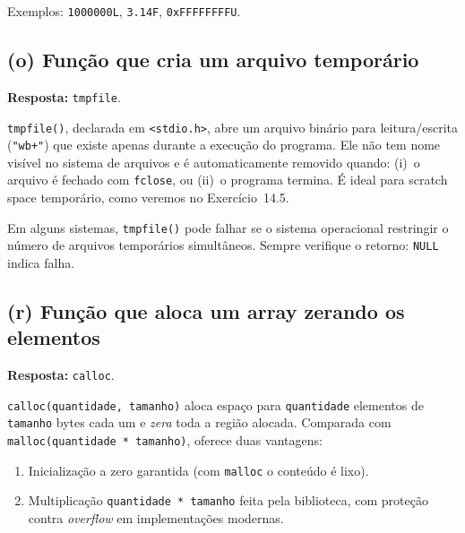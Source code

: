 \documentclass[11pt,a4paper]{article}
\begin{document}
\noindent Exemplos: \texttt{1000000L}, \texttt{3.14F}, \texttt{0xFFFFFFFFU}.

\subsection*{(o) Fun\c{c}\~ao que cria um arquivo tempor\'ario}

\begin{resposta}\textbf{Resposta:} \texttt{tmpfile}.\end{resposta}

\texttt{tmpfile()}, declarada em \texttt{<stdio.h>}, abre um arquivo bin\'ario para leitura/escrita (\texttt{"wb+"}) que existe apenas durante a execu\c{c}\~ao do programa. Ele n\~ao tem nome vis\'ivel no sistema de arquivos e \'e automaticamente removido quando: (i)~o arquivo \'e fechado com \texttt{fclose}, ou (ii)~o programa termina. \'E ideal para scratch space tempor\'ario, como veremos no Exerc\'icio~14.5.

\begin{dicaportab}
Em alguns sistemas, \texttt{tmpfile()} pode falhar se o sistema operacional restringir o n\'umero de arquivos tempor\'arios simult\^aneos. Sempre verifique o retorno: \texttt{NULL} indica falha.
\end{dicaportab}

\subsection*{(r) Fun\c{c}\~ao que aloca um array zerando os elementos}

\begin{resposta}\textbf{Resposta:} \texttt{calloc}.\end{resposta}

\texttt{calloc(quantidade, tamanho)} aloca espa\c{c}o para \texttt{quantidade} elementos de \texttt{tamanho} bytes cada um e \emph{zera} toda a regi\~ao alocada. Comparada com \texttt{malloc(quantidade * tamanho)}, oferece duas vantagens:

\begin{enumerate}[leftmargin=*, itemsep=0pt]
  \item Inicializa\c{c}\~ao a zero garantida (com \texttt{malloc} o conte\'udo \'e lixo).
  \item Multiplica\c{c}\~ao \texttt{quantidade * tamanho} feita pela biblioteca, com prote\c{c}\~ao contra \emph{overflow} em implementa\c{c}\~oes modernas.
\end{enumerate}
\end{document}
